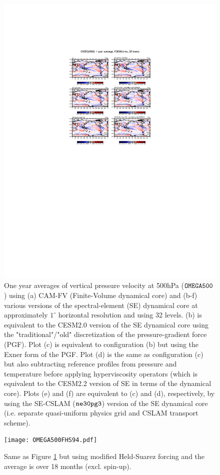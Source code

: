 \documentclass[draft]{agujournal2019}
\begin{document}
\begin{figure}[t]
\begin{center}
\includegraphics[width=145mm]{OMEGA500F2000climo.pdf}
\end{center}
\caption{One year averages of vertical pressure velocity at 500hPa ($\tt OMEGA500$) using (a) CAM-FV (Finite-Volume dynamical core) and (b-f) various versions of the spectral-element (SE) dynamical core at approximately $1^{\circ}$ horizontal resolution and using 32 levels. (b) is equivalent to the CESM2.0 version of the SE dynamical core using the "traditional"/"old" discretization of the pressure-gradient force (PGF). Plot (c) is equivalent to configuration (b) but using the Exner form of the PGF. Plot (d) is the same as configuration (c) but also subtracting reference profiles from pressure and temperature before applying hyperviscosity operators (which is equivalent to the CESM2.2 version of SE in terms of the dynamical core). Plots (e) and (f) are equivalent to (c) and (d), respectively, by using the SE-CSLAM ($\tt ne30pg3$) version of the SE dynamical core (i.e. separate quasi-uniform physics grid and CSLAM transport scheme).}\label{fig:OMEGA500}
\end{figure}
\begin{figure}[t]
\begin{center}
\texttt{[image: OMEGA500FHS94.pdf]}
\end{center}
\caption{Same as Figure \ref{fig:OMEGA500} but using modified Held-Suarez forcing and the average is over 18 months (excl. spin-up).}\label{fig:OMEGA500FHS94}
\end{figure}
\end{document}
